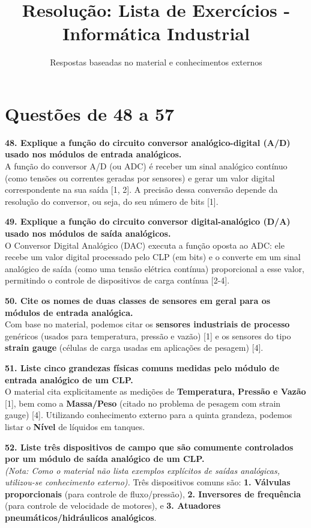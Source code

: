 \documentclass[12pt, a4paper]{article}
\title{\textbf{Resolução: Lista de Exercícios - Informática Industrial}}
\author{Respostas baseadas no material e conhecimentos externos}
\date{}
\begin{document}
\maketitle

\section*{Questões de 48 a 57}

\textbf{48. Explique a função do circuito conversor analógico-digital (A/D) usado nos módulos de entrada analógicos.}
\\
A função do conversor A/D (ou ADC) é receber um sinal analógico contínuo (como tensões ou correntes geradas por sensores) e gerar um valor digital correspondente na sua saída [1, 2]. A precisão dessa conversão depende da resolução do conversor, ou seja, do seu número de bits [1].

\vspace{0.5cm}
\textbf{49. Explique a função do circuito conversor digital-analógico (D/A) usado nos módulos de saída analógicos.}
\\
O Conversor Digital Analógico (DAC) executa a função oposta ao ADC: ele recebe um valor digital processado pelo CLP (em bits) e o converte em um sinal analógico de saída (como uma tensão elétrica contínua) proporcional a esse valor, permitindo o controle de dispositivos de carga contínua [2-4].

\vspace{0.5cm}
\textbf{50. Cite os nomes de duas classes de sensores em geral para os módulos de entrada analógica.}
\\
Com base no material, podemos citar os \textbf{sensores industriais de processo} genéricos (usados para temperatura, pressão e vazão) [1] e os sensores do tipo \textbf{strain gauge} (células de carga usadas em aplicações de pesagem) [4]. 

\vspace{0.5cm}
\textbf{51. Liste cinco grandezas físicas comuns medidas pelo módulo de entrada analógico de um CLP.}
\\
O material cita explicitamente as medições de \textbf{Temperatura, Pressão e Vazão} [1], bem como a \textbf{Massa/Peso} (citado no problema de pesagem com strain gauge) [4]. Utilizando conhecimento externo para a quinta grandeza, podemos listar o \textbf{Nível} de líquidos em tanques.

\vspace{0.5cm}
\textbf{52. Liste três dispositivos de campo que são comumente controlados por um módulo de saída analógico de um CLP.}
\\
\textit{(Nota: Como o material não lista exemplos explícitos de saídas analógicas, utilizou-se conhecimento externo).} Três dispositivos comuns são: \textbf{1. Válvulas proporcionais} (para controle de fluxo/pressão), \textbf{2. Inversores de frequência} (para controle de velocidade de motores), e \textbf{3. Atuadores pneumáticos/hidráulicos analógicos}.
\end{document}
